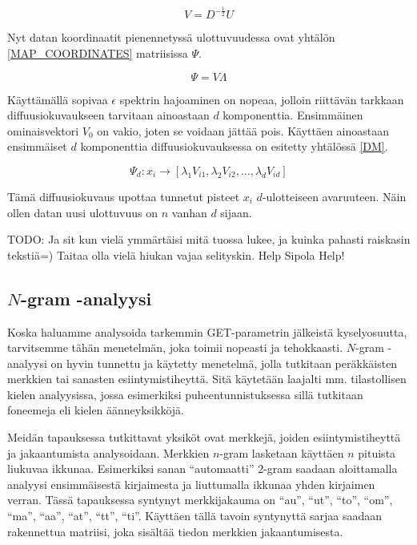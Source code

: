 \begin{equation}
V = D^{-\frac{1}{2}} U
\label{EIGENVECTORS}
\end{equation}

Nyt datan koordinaatit pienennetyssä ulottuvuudessa ovat yhtälön \ref{MAP_COORDINATES} matriisissa $\Psi$. 

\begin{equation}
\Psi = V \Lambda
\label{MAP_COORDINATES}
\end{equation}

Käyttämällä sopivaa $\epsilon$ spektrin hajoaminen on nopeaa, jolloin riittävän tarkkaan diffuusiokuvaukseen tarvitaan ainoastaan $d$ komponenttia. Ensimmäinen ominaisvektori $V_0$ on vakio, joten se voidaan jättää pois.
Käyttäen ainoastaan ensimmäiset $d$ komponenttia diffuusiokuvauksessa on esitetty yhtälössä \ref{DM}.

\begin{equation}
\Psi_d : x_i \to \left[ \lambda_1 V_{i1}, \lambda_2 V_{i2}, \dots, \lambda_d V_{id} \right]
\label{DM}
\end{equation}

Tämä diffuusiokuvaus upottaa tunnetut pisteet $x_i$ $d$-ulotteiseen avaruuteen. Näin ollen datan uusi ulottuvuus on $n$ vanhan $d$ sijaan.

TODO: Ja sit kun vielä ymmärtäisi mitä tuossa lukee, ja kuinka pahasti raiskasin tekstiä=) Taitaa olla vielä hiukan vajaa selityskin. Help Sipola Help!

\subsection{$N$-gram -analyysi}

Koska haluamme analysoida tarkemmin GET-parametrin jälkeistä kyselyosuutta, tarvitsemme tähän menetelmän, joka toimii nopeasti ja tehokkaasti. $N$-gram -analyysi on hyvin tunnettu ja käytetty menetelmä, jolla tutkitaan 
peräkkäisten merkkien tai sanasten esiintymistiheyttä. Sitä käytetään laajalti mm. tilastollisen kielen analyysissa, jossa esimerkiksi puheentunnistuksessa sillä tutkitaan foneemeja eli kielen äänneyksikköjä. 

Meidän tapauksessa tutkittavat yksiköt ovat merkkejä, joiden esiintymistiheyttä ja jakaantumista analysoidaan. Merkkien $n$-gram lasketaan käyttäen $n$ pituista liukuvaa ikkunaa. Esimerkiksi sanan ``automaatti'' 2-gram 
saadaan aloittamalla analyysi ensimmäisestä kirjaimesta ja liuttumalla ikkunaa yhden kirjaimen verran. Tässä tapauksessa syntynyt merkkijakauma on ``au'', ``ut'', ``to'', ``om'', ``ma'', ``aa'', ``at'', ``tt'', ``ti''. 
Käyttäen tällä tavoin syntynyttä sarjaa saadaan rakennettua matriisi, joka sisältää tiedon merkkien jakaantumisesta.

